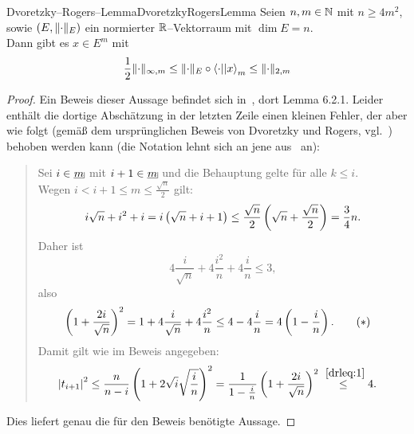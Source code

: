 \begin{lemma}{Dvoretzky--Rogers--Lemma}{DvoretzkyRogersLemma}
Seien $n, m \in \mathbb{N}$ mit $n \ge 4m^2$, sowie $(E, \lVert\cdot\rVert_E)$ ein normierter
$\mathbb{R}$--Vektorraum mit $\dim E = n$.\\
Dann gibt es $x \in E^m$ mit
\[\frac 1 2 \lVert\cdot\rVert_{\infty, m} \le \lVert\cdot\rVert_E \circ \left\langle \cdot ||x\right\rangle_m
\le \lVert\cdot\rVert_{2,m}\]
\end{lemma}
\begin{proof}
Ein Beweis dieser Aussage befindet sich in~\cite{Kad}, dort Lemma 6.2.1.
Leider enthält die dortige Abschätzung in der letzten Zeile einen kleinen
Fehler, der aber wie folgt (gemäß dem ursprünglichen Beweis von Dvoretzky und
Rogers, vgl.~\cite{DR}) behoben werden kann (die Notation lehnt sich an jene
aus~\cite{Kad} an):
\begin{quote}
Sei $i \in \haken m$ mit $i+1 \in \haken m$ und die Behauptung gelte für alle
$k \le i$.\\
Wegen $i < i+1 \le m \le \frac {\sqrt n} 2$ gilt:
\[i\sqrt n + i^2 + i = i\left(\sqrt n+i+1\right)
\le\frac{\sqrt n}2\left(\sqrt n+\frac{\sqrt n}2\right)
= \frac 3 4 n\text.\]
Daher ist
\[4\frac i {\sqrt n} + 4\frac{i^2}n+ 4 \frac i n \le 3,\]
also
\begin{align}\left(1+\frac {2i}{\sqrt n} \right)^2
&= 1 + 4 \frac i{\sqrt n} +  4\frac {i^2}n \le 4 - 4\frac i n 
= 4 \left(1- \frac i n \right)\text. \tag{$\ast$}\label{drleq:1}
\end{align}
Damit gilt wie im Beweis angegeben:
\begin{align*}
\left|t_{i+1}\right|^2 &\le \frac n {n-i}\left(1+ 2\sqrt{i}\sqrt{\frac i n} \right)^2
=\frac 1{1-\frac in}\left(1+\frac{2i}{\sqrt n}\right)^2
\overset{~\eqref{drleq:1}}\le 4\text.
\end{align*}
\end{quote}
Dies liefert genau die für den Beweis benötigte Aussage.
\end{proof}